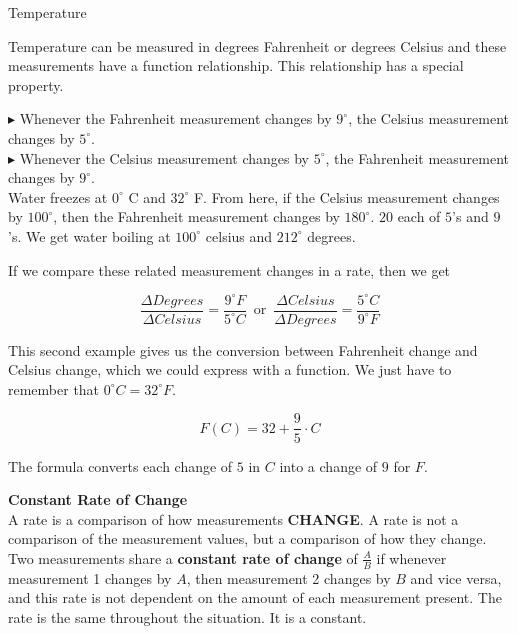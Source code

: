 \documentclass{ximera}
\begin{document}
\begin{example} Temperature


Temperature can be measured in degrees Fahrenheit or degrees Celsius and these measurements have a function relationship. This relationship has a special property.


$\blacktriangleright$ Whenever the Fahrenheit measurement changes by $9^{\circ}$, the Celsius measurement changes by $5^{\circ}$. \\
$\blacktriangleright$ Whenever the Celsius measurement changes by $5^{\circ}$, the Fahrenheit measurement changes by $9^{\circ}$. \\



Water freezes at $0^{\circ}$ C and $32^{\circ}$ F.  From here, if the Celsius measurement changes by $100^{\circ}$, then the Fahrenheit measurement changes by $180^{\circ}$.  $20$ each of $5$'s and $9$'s. We get water boiling at $100^{\circ}$ celsius and $212^{\circ}$ degrees.


If we compare these related measurement changes in a rate, then we get

\[
\frac{\Delta Degrees}{\Delta Celsius} = \frac{9^{\circ}F}{5^{\circ}C} \, \text{ or } \, \frac{\Delta Celsius}{\Delta Degrees} = \frac{5^{\circ}C}{9^{\circ}F}
\]


\end{example} 


This second example gives us the conversion between Fahrenheit change and Celsius change, which we could express with a function.  We just have to remember that $0^{\circ}C = 32^{\circ}F$.

\[
F(C) = 32 + \frac{9}{5} \cdot C
\]


The formula converts each change of $5$ in $C$ into a change of $9$ for $F$.







\begin{definition} \textbf{\textcolor{green!50!black}{Constant Rate of Change}} \\


A rate is a comparison of how measurements \textbf{\textcolor{purple!85!blue}{CHANGE}}. A rate is not a comparison of the measurement values, but a comparison of how they change. \\


Two measurements share a \textbf{constant rate of change} of $\tfrac{A}{B}$ if whenever measurement 1 changes by $A$, then measurement 2 changes by $B$ and vice versa, and this rate is not dependent on the amount of each measurement present.  The rate is the same throughout the situation.  It is a constant.




\end{definition}
\end{document}

